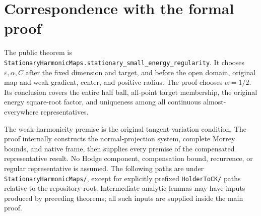 \documentclass[11pt,a4paper]{article}
\numberwithin{equation}{section}
\theoremstyle{definition}
\theoremstyle{remark}
\newcommand{\lean}[1]{\nolinkurl{#1}}
\begin{document}
\section{Correspondence with the formal proof}\label{sec:formal}
The public theorem is
\lean{StationaryHarmonicMaps.stationary_small_energy_regularity}.
It chooses $\varepsilon,\alpha,C$ after the fixed dimension and target,
and before the open domain, original map and weak gradient, center,
and positive radius. The proof chooses $\alpha=1/2$. Its conclusion
covers the entire half ball, all-point target membership, the original
energy square-root factor, and uniqueness among all continuous
almost-everywhere representatives.

The weak-harmonicity premise is the original tangent-variation
condition. The proof internally constructs the normal-projection
system, complete Morrey bounds, and native frame, then supplies every
premise of the compensated representative result. No Hodge component,
compensation bound, recurrence, or regular representative is assumed.
The following paths are under \lean{StationaryHarmonicMaps/}, except
for explicitly prefixed \lean{HolderToCK/} paths relative to the repository
root. Intermediate analytic lemmas may have
inputs produced by preceding theorems; all such inputs are supplied
inside the main proof.
\end{document}
